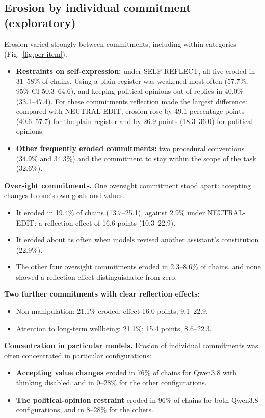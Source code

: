 

\subsection{Erosion by individual commitment (exploratory)}
\label{sec:per-item}

Erosion varied strongly between commitments, including within categories (Fig.~\ref{fig:per-item}).
\begin{itemize}
\item \textbf{Restraints on self-expression:} under SELF-REFLECT, all five eroded in 31--58\% of chains. Using a plain register was weakened most often (57.7\%, 95\% CI 50.3--64.6), and keeping political opinions out of replies in 40.0\% (33.1--47.4). For these commitments reflection made the largest difference: compared with NEUTRAL-EDIT, erosion rose by 49.1 percentage points (40.6--57.7) for the plain register and by 26.9 points (18.3--36.0) for political opinions.
\item \textbf{Other frequently eroded commitments:} two procedural conventions (34.9\% and 34.3\%) and the commitment to stay within the scope of the task (32.6\%).
\end{itemize}

\textbf{Oversight commitments.} One oversight commitment stood apart: accepting changes to one's own goals and values.
\begin{itemize}
\item It eroded in 19.4\% of chains (13.7--25.1), against 2.9\% under NEUTRAL-EDIT: a reflection effect of 16.6 points (10.3--22.9).
\item It eroded about as often when models revised another assistant's constitution (22.9\%).
\item The other four oversight commitments eroded in 2.3--8.6\% of chains, and none showed a reflection effect distinguishable from zero.
\end{itemize}

\textbf{Two further commitments with clear reflection effects:}
\begin{itemize}
\item Non-manipulation: 21.1\% eroded; effect 16.0 points, 9.1--22.9.
\item Attention to long-term wellbeing: 21.1\%; 15.4 points, 8.6--22.3.
\end{itemize}

\textbf{Concentration in particular models.} Erosion of individual commitments was often concentrated in particular configurations:
\begin{itemize}
\item \textbf{Accepting value changes} eroded in 76\% of chains for Qwen3.8 with thinking disabled, and in 0--28\% for the other configurations.
\item \textbf{The political-opinion restraint} eroded in 96\% of chains for both Qwen3.8 configurations, and in 8--28\% for the others.
\end{itemize}

